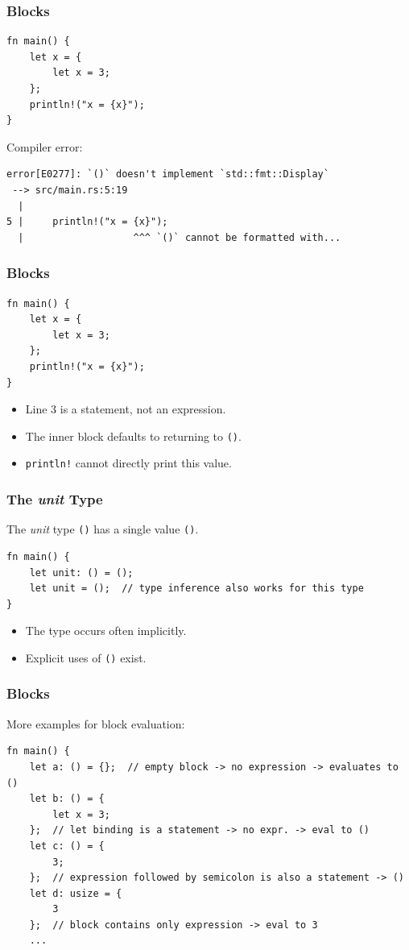 \documentclass[aspectratio=169]{beamer}
\begin{document}
\begin{frame}[fragile]
    \frametitle{Blocks}
    \begin{verbatim}
fn main() {
    let x = {
        let x = 3;
    };
    println!("x = {x}");
}
    \end{verbatim}
    \pause
    Compiler error:
    \begin{verbatim}
error[E0277]: `()` doesn't implement `std::fmt::Display`
 --> src/main.rs:5:19
  |
5 |     println!("x = {x}");
  |                   ^^^ `()` cannot be formatted with...
    \end{verbatim}
\end{frame}

\begin{frame}[fragile]
    \frametitle{Blocks}
    \begin{verbatim}
fn main() {
    let x = {
        let x = 3;
    };
    println!("x = {x}");
}
    \end{verbatim}
    \pause
    \begin{itemize}
        \item Line 3 is a statement, not an expression.
        \item The inner block defaults to returning to \texttt{()}.
        \item \texttt{println!} cannot directly print this value.
    \end{itemize}
\end{frame}


\begin{frame}[fragile]
    \frametitle{The \textit{unit} Type}
    The \textit{unit} type \texttt{()} has a single value \texttt{()}.
    \begin{verbatim}
fn main() {
    let unit: () = ();
    let unit = ();  // type inference also works for this type
}
    \end{verbatim}
    \pause
    \begin{itemize}
        \item The type occurs often implicitly.
        \item Explicit uses of \texttt{()} exist.
    \end{itemize}
\end{frame}

\begin{frame}[fragile]
    \frametitle{Blocks}
    More examples for block evaluation:
    \begin{verbatim}
fn main() {
    let a: () = {};  // empty block -> no expression -> evaluates to ()
    let b: () = {
        let x = 3;
    };  // let binding is a statement -> no expr. -> eval to ()
    let c: () = {
        3;
    };  // expression followed by semicolon is also a statement -> ()
    let d: usize = {
        3
    };  // block contains only expression -> eval to 3
    ...
    \end{verbatim}
\end{frame}
\end{document}
